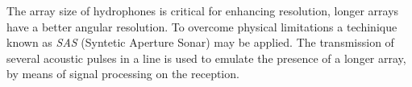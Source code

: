 The array size of hydrophones is critical for enhancing resolution, longer
arrays have a better angular resolution. To overcome physical limitations a
techinique known as \textit{SAS} (Syntetic Aperture Sonar) may be applied. The
transmission of several acoustic pulses in a line is used to emulate the
presence of a longer array, by means of signal processing on the reception.
